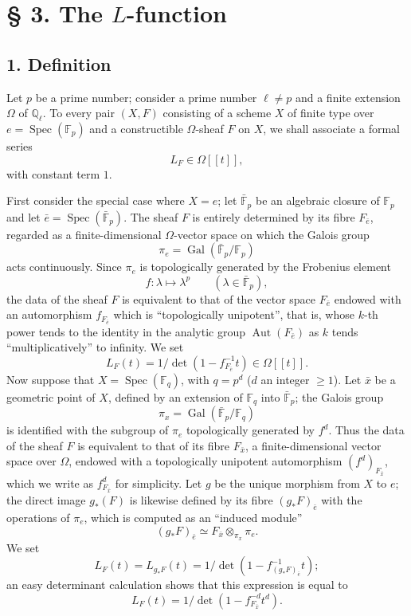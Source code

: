 \documentclass[11pt]{article}
\DeclareMathOperator{\Spec}{Spec}
\providecommand{\Gal}{\operatorname{Gal}}
\providecommand{\Aut}{\operatorname{Aut}}
\providecommand{\Spec}{\operatorname{Spec}}
\providecommand{\Spec}{\operatorname{Spec}}
\providecommand{\Aut}{\operatorname{Aut}}
\providecommand{\Spec}{\operatorname{Spec}}
\providecommand{\Spec}{\operatorname{Spec}}
\providecommand{\Gal}{\operatorname{Gal}}
\begin{document}
\section*{§ 3. The $L$-function}

\subsection*{1. Definition}

Let $p$ be a prime number; consider a prime number $\ell\ne p$ and a finite extension $\Omega$ of $\mathbb Q_\ell$. To every pair $(X,F)$ consisting of a scheme $X$ of finite type over $e=\Spec(\mathbb F_p)$ and a constructible $\Omega$-sheaf $F$ on $X$, we shall associate a formal series
\[
L_F\in\Omega[[t]],
\]
with constant term $1$.


First consider the special case where $X=e$; let $\bar{\mathbb F}_p$ be an algebraic closure of $\mathbb F_p$ and let $\bar e=\Spec(\bar{\mathbb F}_p)$. The sheaf $F$ is entirely determined by its fibre $F_{\bar e}$, regarded as a finite-dimensional $\Omega$-vector space on which the Galois group
\[
\pi_e=\Gal(\bar{\mathbb F}_p/\mathbb F_p)
\]
acts continuously. Since $\pi_e$ is topologically generated by the Frobenius element
\[
f:\lambda\longmapsto\lambda^p\qquad(\lambda\in\bar{\mathbb F}_p),
\]
the data of the sheaf $F$ is equivalent to that of the vector space $F_{\bar e}$ endowed with an automorphism $f_{F_{\bar e}}$ which is ``topologically unipotent'', that is, whose $k$-th power tends to the identity in the analytic group $\Aut(F_{\bar e})$ as $k$ tends ``multiplicatively'' to infinity. We set
\[
L_F(t)=1/\det(1-f_{F_{\bar e}}^{-1}t)\in\Omega[[t]].
\]
Now suppose that $X=\Spec(\mathbb F_q)$, with $q=p^d$ ($d$ an integer $\ge1$). Let $\bar x$ be a geometric point of $X$, defined by an extension of $\mathbb F_q$ into $\bar{\mathbb F}_p$; the Galois group
\[
\pi_x=\Gal(\bar{\mathbb F}_p/\mathbb F_q)
\]
is identified with the subgroup of $\pi_e$ topologically generated by $f^d$. Thus the data of the sheaf $F$ is equivalent to that of its fibre $F_{\bar x}$, a finite-dimensional vector space over $\Omega$, endowed with a topologically unipotent automorphism $(f^d)_{F_{\bar x}}$, which we write as $f^d_{F_{\bar x}}$ for simplicity. Let $g$ be the unique morphism from $X$ to $e$; the direct image $g_*(F)$ is likewise defined by its fibre $(g_*F)_{\bar e}$ with the operations of $\pi_e$, which is computed as an ``induced module''
\[
(g_*F)_{\bar e}\simeq F_{\bar x}\otimes_{\pi_x}\pi_e.
\]
We set
\[
L_F(t)=L_{g_*F}(t)=1/\det(1-f^{-1}_{(g_*F)_{\bar e}}t);
\]
an easy determinant calculation shows that this expression is equal to
\[
L_F(t)=1/\det(1-f^{-d}_{F_{\bar x}}t^d).
\]
\end{document}

